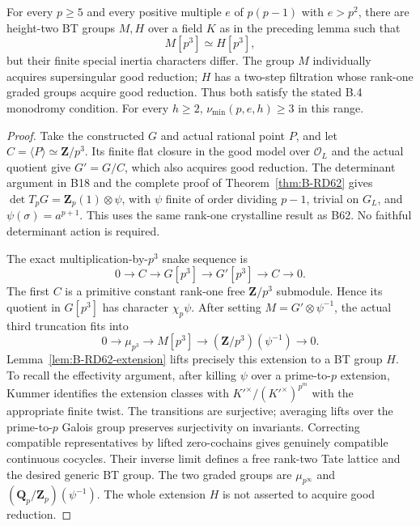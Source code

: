 \begin{theorem}
\label{thm:B-RD100-ambiguity}
For every $p\ge5$ and every positive multiple $e$ of
$p(p-1)$ with $e>p^2$, there are height-two BT groups
$M,H$ over a field $K$ as in the preceding lemma such that
\[
                         M[p^3]\simeq H[p^3],           \tag{B-RD100.9}
\]
but their finite special inertia characters differ.
The group $M$ individually acquires supersingular good
reduction; $H$ has a two-step filtration whose rank-one
graded groups acquire good reduction. Thus both satisfy
the stated B.4 monodromy condition. For every $h\ge2$,
$\nu_{\min}(p,e,h)\ge3$ in this range.
\end{theorem}
\begin{proof}
Take the constructed $G$ and actual rational point $P$,
and let $C=\langle P\rangle\simeq\mathbf Z/p^3$.
Its finite flat closure in the good model over
$\mathcal O_L$ and the actual quotient give $G'=G/C$,
which also acquires good reduction. The determinant
argument in B18 and the complete proof of
Theorem~\ref{thm:B-RD62} gives
$\det T_pG=\mathbf Z_p(1)\otimes\psi$, with $\psi$
finite of order dividing $p-1$, trivial on $G_L$, and
$\psi(\sigma)=a^{p+1}$.
This uses the same rank-one crystalline result
\cite[Corollary~2.2.6]{Kisin2006Crystalline} as B62.
No faithful determinant action is required.

The exact multiplication-by-$p^3$ snake sequence is
\[
 0\longrightarrow C\longrightarrow G[p^3]
 \longrightarrow G'[p^3]\longrightarrow C\longrightarrow0 .
                                                        \tag{B-RD100.10}
\]
The first $C$ is a primitive constant rank-one free
$\mathbf Z/p^3$ submodule. Hence its quotient in $G[p^3]$
has character $\chi_p\psi$. After setting
$M=G'\otimes\psi^{-1}$, the actual third truncation fits into
\[
 0\longrightarrow\mu_{p^3}\longrightarrow M[p^3]
 \longrightarrow(\mathbf Z/p^3)(\psi^{-1})
 \longrightarrow0 .                                   \tag{B-RD100.11}
\]
Lemma~\ref{lem:B-RD62-extension} lifts precisely this
extension to a BT group $H$. To recall the effectivity
argument, after killing $\psi$ over a prime-to-$p$ extension,
Kummer identifies the extension classes with
$K'^\times/(K'^\times)^{p^m}$ with the appropriate finite
twist. The transitions are surjective; averaging lifts over
the prime-to-$p$ Galois group preserves surjectivity on
invariants. Correcting compatible representatives by lifted
zero-cochains gives genuinely compatible continuous cocycles.
Their inverse limit defines a free rank-two Tate lattice and
the desired generic BT group. The two graded groups are
$\mu_{p^\infty}$ and
$(\mathbf Q_p/\mathbf Z_p)(\psi^{-1})$.
The whole extension $H$ is not asserted to acquire good
reduction.


\end{proof}
